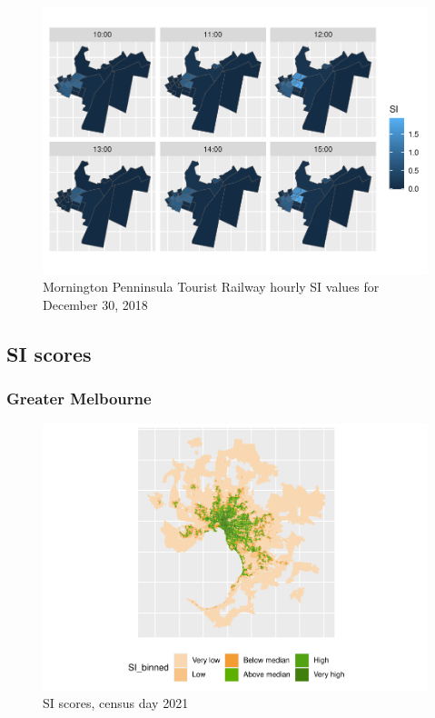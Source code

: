 \documentclass[preprint, 3p,
authoryear]{elsarticle} %
\begin{document}
\begin{figure}
\centering
\includegraphics{Leveraging_GTFS_to_assess_transit_supply_Transport_Geography_files/figure-latex/SI_mornington_20181230_output-1.pdf}
\caption{Mornington Penninsula Tourist Railway hourly SI values for
December 30, 2018}
\end{figure}

\hypertarget{si-scores}{%
\subsection{SI scores}\label{si-scores}}

\hypertarget{greater-melbourne}{%
\subsubsection{Greater Melbourne}\label{greater-melbourne}}

\begin{figure}
\centering
\includegraphics{Leveraging_GTFS_to_assess_transit_supply_Transport_Geography_files/figure-latex/Greater_Melbourne_2016_2021-1.pdf}
\caption{SI scores, census day 2021}
\end{figure}
\end{document}
